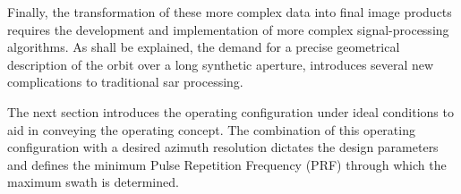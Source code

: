 \par
Finally, the transformation of these more complex data into final image products requires the development and implementation of more complex signal-processing algorithms. As shall be explained, the demand for a precise geometrical description of the orbit over a long synthetic aperture, introduces several new complications to traditional \gls{sar} processing.
\par
The next section introduces the operating configuration under ideal conditions to aid in conveying the operating concept. The combination of this operating configuration with a desired azimuth resolution dictates the design parameters and defines the minimum Pulse Repetition Frequency (PRF) through which the maximum swath is determined.
